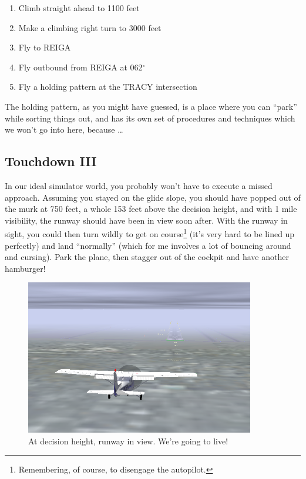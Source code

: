 \begin{enumerate}
\item Climb straight ahead to 1100 feet
\item Make a climbing right turn to 3000 feet
\item Fly to REIGA
\item Fly outbound from REIGA at 062$^\circ$
\item Fly a holding pattern at the TRACY intersection
\end{enumerate}


The holding pattern, as you might have guessed, is a place where you
can ``park'' while sorting things out, and has its own set of
procedures and techniques which we won't go into here, because
\ldots{}
\subsection{Touchdown III}

In our ideal simulator world, you probably won't have to execute a
missed approach.  Assuming you stayed on the glide slope, you should
have popped out of the murk at 750 feet, a whole 153 feet above the
decision height, and with 1 mile visibility, the runway should have
been in view soon after.  With the runway in sight, you could then
turn wildly to get on course\footnote{Remembering, of course, to
  disengage the autopilot.}  (it's very hard to be lined up perfectly)
and land ``normally'' (which for me involves a lot of bouncing around
and cursing).  Park the plane, then stagger out of the cockpit and
have another hamburger!

\begin{figure}
  \begin{center}
    \includegraphics[width=10cm]{img/DH_plane_clipped.png}
    \caption{At decision height, runway in view.  We're going to live!}
    \label{fig:DH_plane_clipped}
  \end{center}
\end{figure}

